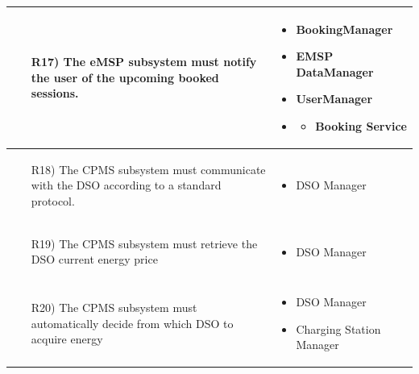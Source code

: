 \documentclass[table, 12pt]{article}
\begin{document}
\begin{longtable}{|p{}|p{}|}
    \begin{itemize}
        \item[R17)] The eMSP subsystem must notify the user of the upcoming booked sessions.
    \end{itemize}
    &
    \begin{itemize}
        \item BookingManager
        \item EMSP DataManager
        \item UserManager
        \item \begin{itemize}\setlength{\itemindent}{-5px}
            \item Booking Service
        \end{itemize}
    \end{itemize}\\\hline

    \begin{itemize}
        \item[R18)] The CPMS subsystem must communicate with the DSO according to a standard protocol.
    \end{itemize}
    & 
    \begin{itemize}
        \item DSO Manager
    \end{itemize}
    \\\hline

    \begin{itemize}
        \item[R19)] The CPMS subsystem must retrieve the DSO current energy price
    \end{itemize}
    & 
    \begin{itemize}
        \item DSO Manager
    \end{itemize}
    \\\hline

    \begin{itemize}
        \item[R20)] The CPMS subsystem must automatically decide from which DSO to acquire energy
    \end{itemize}
    & 
    \begin{itemize}
        \item DSO Manager
        \item Charging Station Manager
    \end{itemize}
    \\\hline


\end{longtable}
\end{document}
